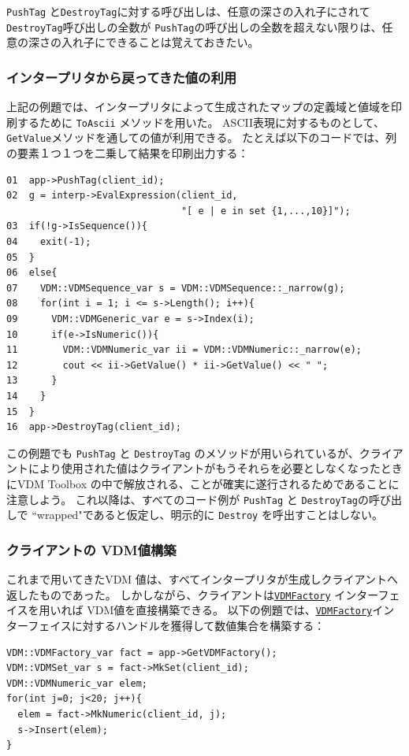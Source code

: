 \documentclass[\pformat,12pt]{jarticle}
\newcommand{\VDMFactory}{\hyperlink{interface.VDMFactory}{VDMFactory}}
\begin{document}
 {\tt PushTag} と{\tt DestroyTag}に対する呼び出しは、任意の深さの入れ子にされて
{\tt DestroyTag}呼び出しの全数が {\tt PushTag}の呼び出しの全数を超えない限りは、任意の深さの入れ子にできることは覚えておきたい。

\subsubsection{インタープリタから戻ってきた値の利用}

上記の例題では、インタープリタによって生成されたマップの定義域と値域を印刷するために {\tt ToAscii} メソッドを用いた。
ASCII表現に対するものとして、 {\tt  GetValue}メソッドを通しての値が利用できる。
たとえば以下のコードでは、列の要素１つ１つを二乗して結果を印刷出力する：

\begin{verbatim}
01  app->PushTag(client_id);
02  g = interp->EvalExpression(client_id, 
                               "[ e | e in set {1,...,10}]");
03  if(!g->IsSequence()){
04    exit(-1);
05  }
06  else{
07    VDM::VDMSequence_var s = VDM::VDMSequence::_narrow(g);
08    for(int i = 1; i <= s->Length(); i++){
09      VDM::VDMGeneric_var e = s->Index(i);
10      if(e->IsNumeric()){
11        VDM::VDMNumeric_var ii = VDM::VDMNumeric::_narrow(e);
12        cout << ii->GetValue() * ii->GetValue() << " ";
13      }
14    }
15  }
16  app->DestroyTag(client_id);
\end{verbatim}

この例題でも {\tt PushTag} と {\tt DestroyTag} のメソッドが用いられているが、クライアントにより使用された値はクライアントがもうそれらを必要としなくなったときにVDM Toolbox の中で解放される、ことが確実に遂行されるためであることに注意しよう。
これ以降は、すべてのコード例が {\tt PushTag} と {\tt DestroyTag}の呼び出しで ``wrapped"であると仮定し、明示的に {\tt Destroy} を呼出すことはしない。

\subsubsection{クライアントの VDM値構築}

これまで用いてきたVDM 値は、すべてインタープリタが生成しクライアントへ返したものであった。
しかしながら、クライアントは{\tt \VDMFactory} インターフェイスを用いれば VDM値を直接構築できる。
以下の例題では、{\tt \VDMFactory}インターフェイスに対するハンドルを獲得して数値集合を構築する：

\begin{verbatim}
VDM::VDMFactory_var fact = app->GetVDMFactory();
VDM::VDMSet_var s = fact->MkSet(client_id);
VDM::VDMNumeric_var elem;
for(int j=0; j<20; j++){
  elem = fact->MkNumeric(client_id, j);
  s->Insert(elem);
}
\end{verbatim}
\end{document}
